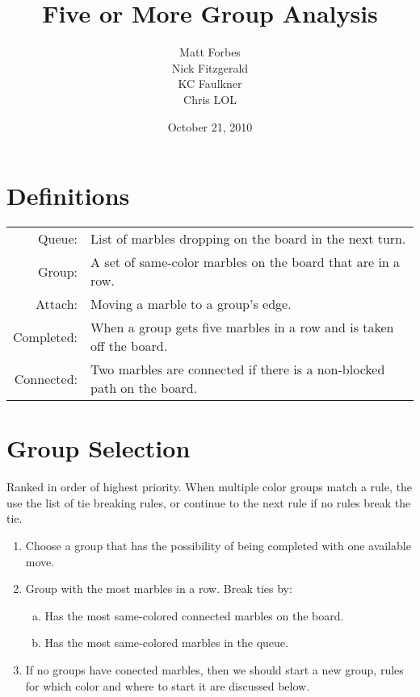 \documentclass[a4paper,12pt]{article}
\begin{document}
\title{Five or More Group Analysis}
\date{October 21, 2010}
\author{Matt Forbes \\ Nick Fitzgerald \\ KC Faulkner \\ Chris LOL}
\maketitle

\section*{Definitions}
\begin{tabular}{r l}
    Queue:& List of marbles dropping on the board in the next turn. \\
    Group:& A set of same-color marbles on the board that are in a row. \\
    Attach:& Moving a marble to a group's edge.\\
    Completed:& When a group gets five marbles in a row and is taken off the board.\\
    Connected:& Two marbles are connected if there is a non-blocked path on the board.
\end{tabular}

\section*{Group Selection}

Ranked in order of highest priority. When multiple color groups match a rule, the use
the list of tie breaking rules, or continue to the next rule if no rules break the tie.

\begin{enumerate}[1)]

    \item Choose a group that has the possibility of being completed with one available move.

    \item Group with the most marbles in a row. Break ties by:
        \begin{enumerate}[a)]
            \item Has the most same-colored connected marbles on the board.
            \item Has the most same-colored marbles in the queue. 
        \end{enumerate}

    \item If no groups have conected marbles, then we should start a new group, rules for which
        color and where to start it are discussed below.

\end{enumerate}
\end{document}
